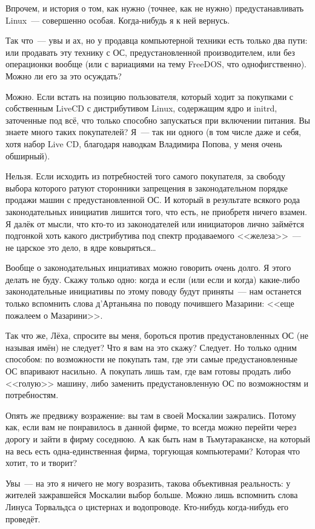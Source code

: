 Впрочем, и история о том, как нужно (точнее, как не нужно) предустанавливать Linux~--- совершенно особая. Когда-нибудь я к ней вернусь.

Так что~--- увы и ах, но у продавца компьютерной техники есть только два пути: или продавать эту технику с ОС, предустановленной производителем, или без операционки вообще (или с вариациями на тему FreeDOS, что однофигственно). Можно ли его за это осуждать?

Можно. Если встать на позицию пользователя, который ходит за покупками с собственным LiveCD с дистрибутивом Linux, содержащим ядро и initrd, заточенные под всё, что только способно запускаться при включении питания. Вы знаете много таких покупателей? Я~--- так ни одного (в том числе даже и себя, хотя набор Live CD, благодаря наводкам Владимира Попова, у меня очень обширный).

Нельзя. Если исходить из потребностей того самого покупателя, за свободу выбора которого ратуют сторонники запрещения в законодательном порядке продажи машин с предустановленной ОС. И который в результате всякого рода законодательных инициатив лишится того, что есть, не приобретя ничего взамен. Я далёк от мысли, что кто-то из законодателей или инициаторов лично займётся подгонкой хоть какого дистрибутива под спектр продаваемого <<железа>>~--- не царское это дело, в ядре ковыряться\dots

Вообще о законодательных инциативах можно говорить очень долго. Я этого делать не буду. Скажу только одно: когда и если (или если и когда) какие-либо законодательные инициативы по этому поводу будут приняты~--- нам останется только вспомнить слова д'Артаньяна по поводу почившего Мазарини: << еще пожалеем о Мазарини>>.

Так что же, Лёха, спросите вы меня, бороться против предустановленных ОС (не называя имён) не следует? Что я вам на это скажу? Следует. Но только одним способом: по возможности не покупать там, где эти самые предустановленные ОС впаривают насильно. А покупать лишь там, где вам готовы продать либо <<голую>> машину, либо заменить предустановленную ОС по возможностям и потребностям.

Опять же предвижу возражение: вы там в своей Москалии зажрались. Потому как, если вам не понравилось в данной фирме, то всегда можно перейти через дорогу и зайти в фирму соседнюю. А как быть нам в Тьмутараканске, на который на весь есть одна-единственная фирма, торгующая компьютерами? Которая что хотит, то и творит?

Увы~--- на это я ничего не могу возразить, такова объективная реальность: у жителей зажравшейся Москалии выбор больше. Можно лишь вспомнить слова Линуса Торвальдса о цистернах и водопроводе. Кто-нибудь когда-нибудь его проведёт.

